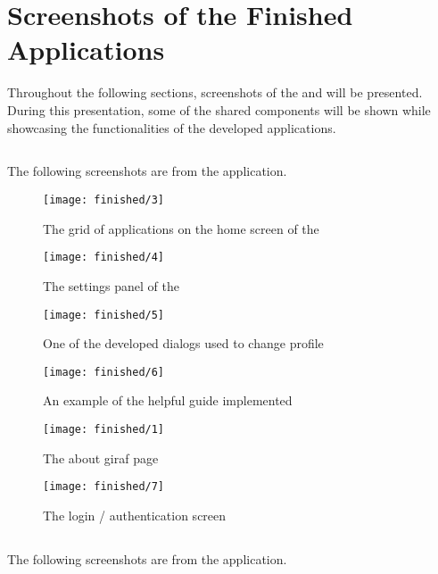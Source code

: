 
\chapter{Screenshots of the Finished Applications}
Throughout the following sections, screenshots of the \launcher and \ct will be presented. During this presentation, some of the shared components will be shown while showcasing the functionalities of the developed applications.

\section{\launcher}
The following screenshots are from the \launcher application.

\begin{figure}[!htbp]
	\centering
	\texttt{[image: finished/3]}
	\caption{The grid of applications on the home screen of the \launcher}
\end{figure}
\FloatBarrier

\begin{figure}[!htbp]
	\centering
	\texttt{[image: finished/4]}
	\caption{The settings panel of the \launcher}
\end{figure}
\FloatBarrier

\begin{figure}[!htbp]
	\centering
	\texttt{[image: finished/5]}
	\caption{One of the developed dialogs used to change profile}
\end{figure}
\FloatBarrier

\begin{figure}[!htbp]
	\centering
	\texttt{[image: finished/6]}
	\caption{An example of the helpful guide implemented}
\end{figure}
\FloatBarrier

\begin{figure}[!htbp]
	\centering
	\texttt{[image: finished/1]}
	\caption{The about giraf page}
\end{figure}
\FloatBarrier

\begin{figure}[!htbp]
	\centering
	\texttt{[image: finished/7]}
	\caption{The login / authentication screen}
\end{figure}
\FloatBarrier

\section{\ct}
The following screenshots are from the \ct application.

